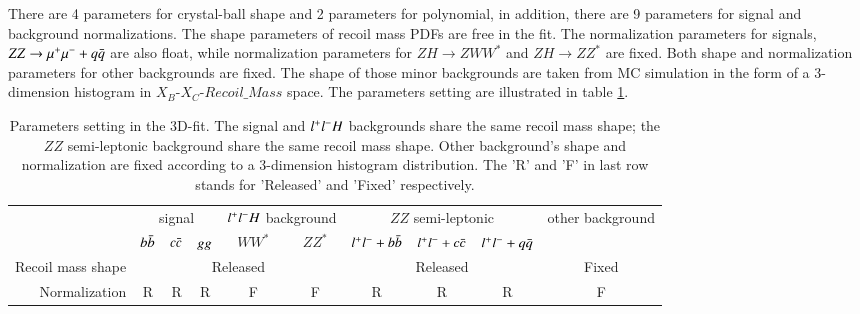  There are 4 parameters for crystal-ball shape and 2 parameters for polynomial, in addition, there are 9 parameters for signal and background 
 normalizations. 
 The shape parameters of recoil mass PDFs are free in the fit. 
 The normalization parameters for signals, $ZZ\rightarrow \mu^{+}\mu^{-}+q\bar{q}$ are also float, while normalization parameters for $ZH\to ZWW^*$ and $ZH\to ZZ^*$ are fixed. Both shape and normalization parameters for other backgrounds are fixed. The shape of those minor backgrounds are taken from MC simulation in 
 the form of a 3-dimension histogram in $X_B$-$X_C$-$Recoil\_Mass$ space. 
  The parameters setting are illustrated in table \ref{tab:fit_3d_para}.\par
  \begin{table}\label{tab:fit_3d_para}
  \centering
  \begin{tabular}{r|c|c|c|c|c|c|c|c|c} \hline
              &\multicolumn{3}{|c|}{signal}&\multicolumn{2}{|c|}{$l^{+}l^{-}H$ background}   & \multicolumn{3}{|c|}{$ZZ$ semi-leptonic} & other background \\ \cline{2-9}
              & $b\bar{b}$ & $c\bar{c}$ & $gg$ & $WW^*$ &
                 $ZZ^*$  & $l^{+}l^{-} + b\bar{b}$ &  $l^{+}l^{-} + c\bar{c}$       &  $l^{+}l^{-} + q\bar{q}$  &   \\ \hline
  Recoil mass shape  &    \multicolumn{5}{|c|}{Released}   &    \multicolumn{3}{|c|}{Released}  &   Fixed \\ \hline 
  Normalization      & R & R & R & F & F & R& R &R & F\\ \hline           
  \end{tabular}
  \caption{Parameters setting in the 3D-fit. The signal and $l^{+}l^{-}H$ backgrounds share the same recoil mass shape; the $ZZ$ semi-leptonic background share the same recoil mass shape. Other background's shape and normalization are fixed according to a 3-dimension histogram distribution. The 'R' and 'F' in last row stands for 'Released' and 'Fixed' respectively. }
  \end{table}

